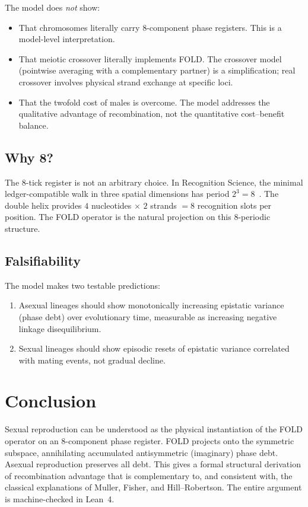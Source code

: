 \documentclass[11pt,twocolumn]{article}
\begin{document}
The model does \emph{not} show:
\begin{itemize}
\item That chromosomes literally carry 8-component phase registers. This
  is a model-level interpretation.
\item That meiotic crossover literally implements FOLD. The crossover
  model (pointwise averaging with a complementary partner) is a
  simplification; real crossover involves physical strand exchange at
  specific loci.
\item That the twofold cost of males is overcome. The model addresses the
  qualitative advantage of recombination, not the quantitative
  cost--benefit balance.
\end{itemize}

\subsection{Why 8?}

The 8-tick register is not an arbitrary choice. In Recognition Science,
the minimal ledger-compatible walk in three spatial dimensions has period
$2^3 = 8$~\cite{Washburn2025}. The double helix provides $4$ nucleotides
$\times$ $2$ strands $= 8$ recognition slots per position. The FOLD
operator is the natural projection on this 8-periodic structure.

\subsection{Falsifiability}

The model makes two testable predictions:
\begin{enumerate}
\item Asexual lineages should show monotonically increasing epistatic
  variance (phase debt) over evolutionary time, measurable as increasing
  negative linkage disequilibrium.
\item Sexual lineages should show episodic resets of epistatic variance
  correlated with mating events, not gradual decline.
\end{enumerate}

\section{Conclusion}

Sexual reproduction can be understood as the physical instantiation of the
FOLD operator on an 8-component phase register. FOLD projects onto the
symmetric subspace, annihilating accumulated antisymmetric (imaginary)
phase debt. Asexual reproduction preserves all debt. This gives a formal
structural derivation of recombination advantage that is complementary to,
and consistent with, the classical explanations of Muller, Fisher, and
Hill--Robertson. The entire argument is machine-checked in Lean~4.
\end{document}

